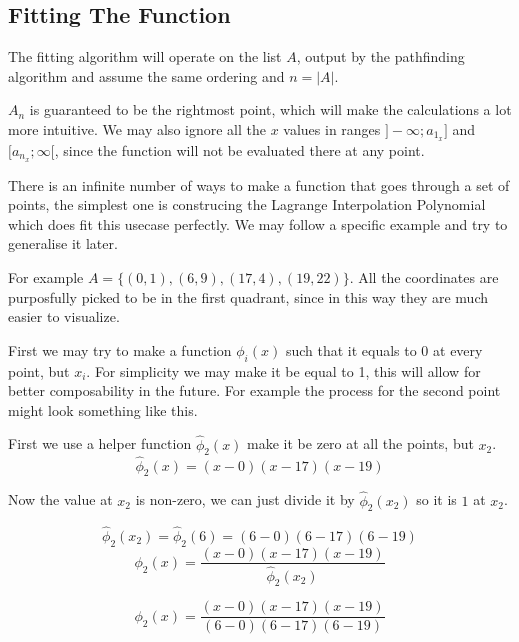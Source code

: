 \documentclass[12pt, titlepage]{article}
\begin{document}
\subsection{Fitting The Function}

The fitting algorithm will operate on the list $A$, output by the 
pathfinding algorithm and assume the same ordering and $n = |A|$.

$A_n$ is guaranteed to be the rightmost point, which
will make the calculations a lot more intuitive.
We may also ignore all the $x$ values in ranges 
$]-\infty; a_{1_x}]$ and $[a_{n_x}; \infty[$, since the function will not be 
evaluated there at any point.

There is an infinite number of ways to make a function that goes through a set of
points\cite{weierstrass, pacific}, the simplest one is construcing the Lagrange Interpolation Polynomial\cite{polynomial}
which does fit this usecase perfectly. We may follow a specific example 
and try to generalise it later. 

For example $A = \{(0, 1), (6, 9),
(17, 4),  (19, 22)\}$. All the coordinates are
purposfully picked to be in the first quadrant, since in this way they are
much easier to visualize.

First we may try to make a function $\phi_i(x)$ such that it equals to 0 at
every point, but $x_i$. For simplicity we may make it be equal to 1, this will
allow for better composability in the future. For example the process for 
the second point might look something like this.

First we use a helper function $\hat{\phi}_2(x)$ make it be zero at all the points, but $x_2$.
\begin{equation}
    \hat{\phi}_2(x) = (x - 0)(x - 17)(x - 19)
\end{equation}

Now the value at $x_2$ is non-zero, we can just divide it by $\hat{\phi}_2(x_2)$ 
so it is $1$ at $x_2$.

\begin{equation}
    \hat{\phi}_2(x_2) = \hat{\phi}_2(6) = (6 - 0)(6 - 17)(6 - 19)
\end{equation}
\begin{equation}
    \phi_2(x) = \frac{(x - 0)(x - 17)(x - 19)}{\hat{\phi}_2(x_2)}
\end{equation}

\begin{equation}
    \phi_2(x) = \frac{(x - 0)(x - 17)(x - 19)}{(6 - 0)(6 - 17)(6 - 19)}
\end{equation}
\end{document}
